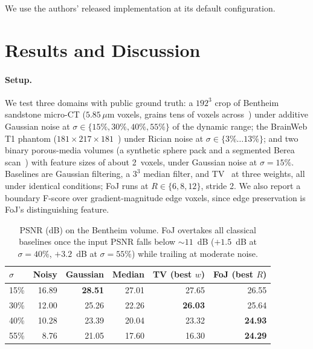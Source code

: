 \documentclass[11pt]{article}
\begin{document}
We use the authors' released implementation at its default
configuration.

\section{Results and Discussion}

\paragraph{Setup.}
We test three domains with public ground truth: a $192^3$ crop of
Bentheim sandstone micro-CT ($5.85\,\mu\mathrm{m}$ voxels, grains tens
of voxels across~\cite{bentheim2015zenodo}) under additive Gaussian
noise at $\sigma\in\{15\%,30\%,40\%,55\%\}$ of the dynamic range; the
BrainWeb T1 phantom ($181{\times}217{\times}181$~\cite{collins1998brainweb})
under Rician noise at $\sigma\in\{3\%\ldots13\%\}$; and two binary
porous-media volumes (a synthetic sphere pack and a segmented Berea
scan~\cite{neumann2020sandstones}) with feature sizes of about
2~voxels, under Gaussian noise at $\sigma{=}15\%$. Baselines are
Gaussian filtering, a $3^3$ median filter, and
TV~\cite{rudin1992nonlinear,chambolle2004algorithm} at three weights,
all under identical conditions; FoJ runs at $R\in\{6,8,12\}$, stride 2.
We also report a boundary F-score over gradient-magnitude edge voxels,
since edge preservation is FoJ's distinguishing feature.

\begin{table}[t]
\centering\small
\begin{tabular}{lrrrrr}
\toprule
$\sigma$ & Noisy & Gaussian & Median & TV (best $w$) & FoJ (best $R$)\\
\midrule
15\% & 16.89 & \textbf{28.51} & 27.01 & 27.65 & 26.55\\
30\% & 12.00 & 25.26 & 22.26 & \textbf{26.03} & 25.64\\
40\% & 10.28 & 23.39 & 20.04 & 23.32 & \textbf{24.93}\\
55\% & \phantom{0}8.76 & 21.05 & 17.60 & 16.30 & \textbf{24.29}\\
\bottomrule
\end{tabular}
\caption{PSNR (dB) on the Bentheim volume. FoJ overtakes all classical
baselines once the input PSNR falls below ${\sim}11$~dB ($+1.5$~dB at
$\sigma{=}40\%$, $+3.2$~dB at $\sigma{=}55\%$) while trailing at moderate
noise.}
\label{tab:bentheim}
\end{table}
\end{document}
